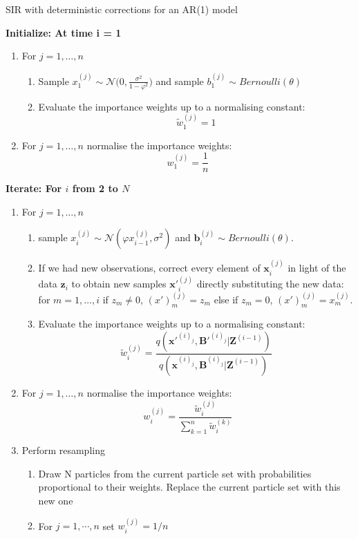 \documentclass[11pt,a4paper]{article}
\renewcommand{\vec}[1]{\mathbf{#1}}
\begin{document}
{\begin{algorithm}[H]
\caption{SIR with deterministic corrections for an AR(1) model}\label{euclid}
 \begin{algorithmic}

 \State  \bf{Initialize:} \normalfont At time i = 1
            
\begin{enumerate}
	\item For $j = 1, \dots , n$
	\begin{enumerate}
		\item Sample $x_{1}^{(j)} \sim \mathcal{N} \Bigg (0, \frac{\sigma^2}{1- \varphi^2} \Bigg)$ and sample $b_1^{(j)} \sim Bernoulli(\theta)$
		\item Evaluate the importance weights up to a normalising constant:
		\[
		\tilde{w}^{(j)}_{1} = 1
		\]
	\end{enumerate}
	\item For $j = 1, \dots , n$ normalise the importance weights: 
	\[
	w^{(j)}_{1} = \frac{1}{n}
	\]
\end{enumerate}

 \State  \bf{Iterate:} \normalfont For $i$ from 2 to $N$

\begin{enumerate}
	\item For $j = 1, \dots , n$
	\begin{enumerate}
  		\item sample $x_{i}^{(j)} \sim \mathcal{N} (\varphi x_{i-1}^{(j)}, \sigma^{2})$ and $\vec{b}_i^{(j)} \sim Bernoulli(\theta)$.
		\item {If we had new observations, correct every element of $\vec{x}_{i}^{(j)}$ in light of the data $\vec{z}_{i}$ to obtain new samples $\vec{x'}_{i}^{(j)}$ directly substituting the new data: for $m = 1, \dots ,i$ if $z_{m} \neq 0$, $(x')_m^{(j)} = z_{m}$ else if $z_{m} = 0$, $(x')_m^{(j)} = x_m^{(j)}$.}
		\item Evaluate the importance weights up to a normalising constant:
		\[
		\tilde{w}^{(j)}_{i} = \frac{q(\vec{x'}^{(i)_j}, \vec{B'}^{(i)_j} | \vec{Z}^{(i-1)})}{q(\vec{x}^{(i)_j}, \vec{B}^{(i)_j} | \vec{Z}^{(i-1)})}
		\]
	\end{enumerate}
	\item For $j = 1, \dots , n$ normalise the importance weights:
	\[
	w^{(j)}_{i} = \frac{\tilde{w}^{(j)}_{i}}{\sum_{k=1}^{n}\tilde{w}^{(k)}_{i}}
	\]
	\item Perform resampling
	\begin{enumerate}
	    \item Draw N particles from the current particle set with probabilities proportional to their weights. Replace the current particle set with this new one
	    \item For $j=1,\cdots ,n$ set $w_{i}^{(j)}=1/n$
	\end{enumerate}
	


\end{enumerate}
\end{algorithmic}
\end{algorithm}}
\end{document}
